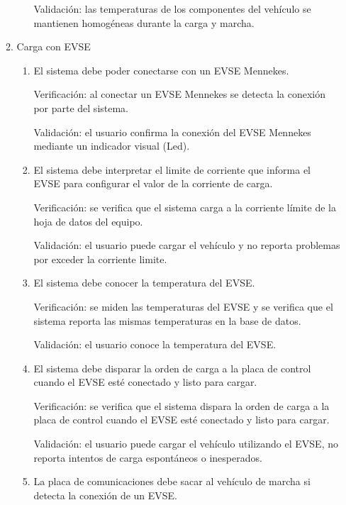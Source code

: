 \documentclass[
11pt, %
codirector, %
]{charter}
\begin{document}
\begin{enumerate}
\begin{enumerate}
\begin{enumerate}
			                  Validación: las temperaturas de los componentes del vehículo se mantienen homogéneas durante la carga y marcha.

		            \end{enumerate}
		      \item Carga con EVSE
		            \begin{enumerate}
			            \item El sistema debe poder conectarse con un EVSE Mennekes.

			                  Verificación: al conectar un EVSE Mennekes se detecta la conexión por parte del sistema.

			                  Validación: el usuario confirma la conexión del EVSE Mennekes mediante un indicador visual (Led).
			            \item El sistema debe interpretar el limite de corriente que informa el EVSE para configurar el valor de la corriente de carga.

			                  Verificación: se verifica que el sistema carga a la corriente límite de la hoja de datos del equipo.

			                  Validación: el usuario puede cargar el vehículo y no reporta problemas por exceder la corriente limite.

			            \item El sistema debe conocer la temperatura del EVSE.

			                  Verificación: se miden las temperaturas del EVSE y se verifica que el sistema reporta las mismas temperaturas en la base de datos.

			                  Validación: el usuario conoce la temperatura del EVSE.

			            \item El sistema debe disparar la orden de carga a la placa de control cuando el EVSE esté conectado y listo para cargar.

			                  Verificación: se verifica que el sistema dispara la orden de carga a la placa de control cuando el EVSE esté conectado y listo para cargar.

			                  Validación: el usuario puede cargar el vehículo utilizando el EVSE, no reporta intentos de carga espontáneos o inesperados.

			            \item La placa de comunicaciones debe sacar al vehículo de marcha si detecta la conexión de un EVSE.


\end{enumerate}
\end{enumerate}
\end{enumerate}
\end{document}
